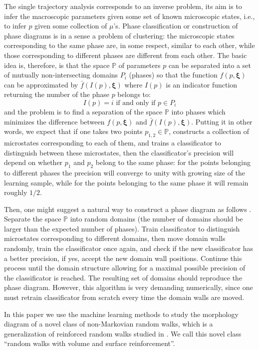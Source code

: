 \documentclass[aps,a4paper,twocolumn,showpacs]{revtex4}
\newcommand{\be}{\begin{equation}}
\newcommand{\ee}{\end{equation}}
\begin{document}
The single trajectory analysis corresponds to an inverse problem, its aim is to infer the macroscopic parameters given some set of known microscopic states, i.e., to infer $p$ given some collection of $\mu$'s. Phase classification or construction of phase diagrams is in a sense a problem of clustering: the microscopic states corresponding to the same phase are, in some respect, similar to each other, while those corresponding to different phases are different from each other. The basic idea is, therefore, is that the space $\mathbb{P}$ of parameters $p$ can be separated into a set of mutually non-intersecting domains $P_i$ (phases) so that the function $f(p,\boldsymbol{\xi})$ can be approximated by  $\bar{f}(I(p),\boldsymbol{\xi})$ where $I(p)$ is an indicator function returning the number of the phase $p$ belongs to:
\be
I(p) = i \text{ if and only if  } p\in P_i
\ee 
and the problem is to find a separation of the space $\mathbb{P}$ into phases which minimizes the difference between $f(p,\boldsymbol{\xi})$ and $\bar{f}(I(p),\boldsymbol{\xi})$. Putting it in other words, we expect that if one takes two points $p_{1,2} \in \mathbb{P}$, constructs a collection of microstates corresponding to each of them, and trains a classificator to distinguish between these microstates, then the classificator's precision will depend on whether $p_1$ and $p_2$ belong to the same phase: for the points belonging to different phases the precision will converge to unity with growing size of the learning sample, while for the points belonging to the same phase it will remain roughly $1/2$.  

Then, one might suggest a natural way to construct a phase diagram as follows \cite{Van_Nieuwenburg}. Separate the space $\mathbb{P}$ into random domains (the number of domains should be larger than the expected number of phases). Train classificator to distinguish microstates corresponding to different domains, then move domain walls randomly, train the classificator once again, and check if the new classificator has a better precision, if yes, accept the new domain wall positions. Continue this process until the domain structure allowing for a maximal possible precision of the classificator is reached. The resulting set of domains should reproduce the phase diagram. However, this algorithm is very demanding numerically, since one must retrain classificator from scratch every time the domain walls are moved. 

In this paper we use the machine learning methods to study the morphology diagram of a novel class of non-Markovian random walks, which is a generalization of reinforced random walks studied in \cite{sapozhnikov, ordemann, foster}. We call this novel class ``random walks with volume and surface reinforcement''.
\end{document}
